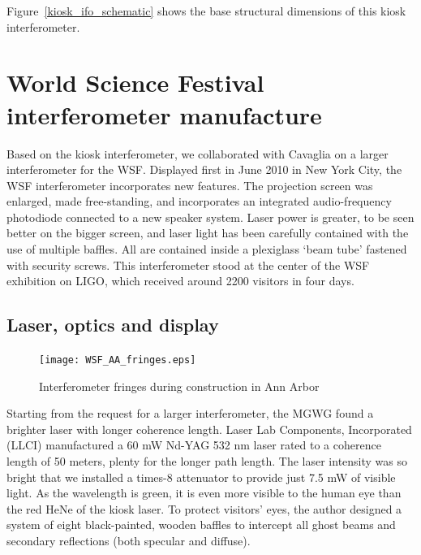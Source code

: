 Figure~\ref{kiosk_ifo_schematic} shows the base structural dimensions of this kiosk interferometer.


    \section{World Science Festival interferometer manufacture}
    \label{manufacture}

    
Based on the kiosk interferometer, we collaborated with Cavaglia on a larger interferometer for the WSF.
Displayed first in June 2010 in New York City, the WSF interferometer incorporates new features.
The projection screen was enlarged, made free-standing,
and incorporates an integrated audio-frequency photodiode connected to a new speaker system.
Laser power is greater, to be seen better on the bigger screen, and
laser light has been carefully contained with the use of multiple baffles.
All are contained inside a plexiglass `beam tube' fastened with security screws.
This interferometer stood at the center of the WSF exhibition on LIGO, which received around 2200 visitors in four days.


        \subsection{Laser, optics and display}
        \label{laser_display}


	\begin{figure}
	\begin{center}
	\texttt{[image: WSF\_AA\_fringes.eps]}
	\caption{Interferometer fringes during construction in Ann Arbor}
	\label{WSF_AA_fringes}
	\end{center}
	\end{figure}

Starting from the request for a larger interferometer, the MGWG found a brighter laser with longer coherence length.
Laser Lab Components, Incorporated (LLCI) manufactured a 60 mW Nd-YAG 532 nm laser rated to a coherence length of 50 meters, plenty for the longer path length.
The laser intensity was so bright that we installed a times-8 attenuator to provide just 7.5 mW of visible light.
As the wavelength is green, it is even more visible to the human eye than the red HeNe of the kiosk laser.
To protect visitors' eyes, the author designed a system of eight black-painted, wooden baffles to intercept all ghost beams and secondary reflections (both specular and diffuse).


